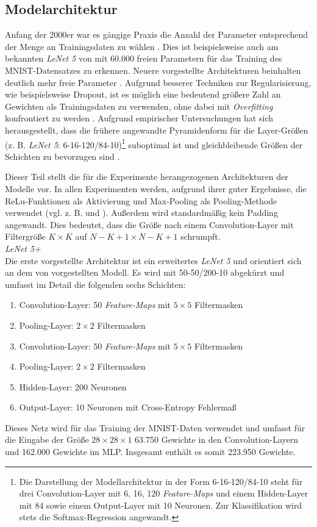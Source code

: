 \subsection{Modelarchitektur}
Anfang der 2000er war es gängige Praxis die Anzahl der Parameter entsprechend der Menge an Trainingsdaten zu wählen
\cite[vgl.][S. 95 f.]{Zander2001}. 
Dies ist beispielsweise auch am bekannten \textit{LeNet 5} von \cite{LeCun1998} mit 60.000 freien Parametern für das Training des MNIST-Datensatzes zu erkennen.
Neuere vorgestellte Architekturen beinhalten deutlich mehr freie Parameter \cite[vgl. z. B.][]{Andrade2014}. Aufgrund besserer Techniken zur Regularisierung, wie beispielsweise Dropout, ist es möglich eine bedeutend größere Zahl an Gewichten als Trainingsdaten zu verwenden, ohne dabei mit \textit{Overfitting} konfrontiert zu werden \cite[vgl.][]{Bengio2012}.
Aufgrund empirischer Untersuchungen hat sich herausgestellt, dass die frühere angewandte Pyramidenform für die Layer-Größen (z. B. \textit{LeNet 5}: 6-16-120/84-10)\footnote{Die Darstellung der Modellarchitektur in der Form 6-16-120/84-10 steht für drei Convolution-Layer mit 6, 16, 120 \textit{Feature-Maps} und einem Hidden-Layer mit 84 sowie einem Output-Layer mit 10 Neuronen. Zur Klassifikation wird stets die Softmax-Regression angewandt.} suboptimal ist und gleichbleibende Größen der Schichten zu bevorzugen sind \cite[vgl.][]{Larochell2009}. 

Dieser Teil stellt die für die Experimente herangezogenen Architekturen der Modelle vor. In allen Experimenten werden, aufgrund ihrer guter Ergebnisse, die ReLu-Funktionen als Aktivierung und Max-Pooling als Pooling-Methode verwendet (vgl. z. B. \cite{Krizhevsky2012} und \cite{Simonyan2014}). Außerdem wird standardmäßig kein Padding angewandt. Dies bedeutet, dass die Größe nach einem Convolution-Layer mit Filtergröße $K \times K$ auf $N - K + 1 \times N - K + 1$ schrumpft.\\

\textit{LeNet 5+}\\
Die erste vorgestellte Architektur ist ein erweitertes \textit{LeNet 5} und orientiert sich an dem von \cite{Ranzato2006} vorgestellten Modell. 
Es wird mit 50-50/200-10 abgekürzt und umfasst im Detail die folgenden sechs Schichten:
\begin{enumerate}
\setlength{\itemsep}{0pt}
\item Convolution-Layer: 50 \textit{Feature-Maps} mit $5 \times 5$ Filtermasken
\item Pooling-Layer:	$2 \times 2$ Filtermasken
\item Convolution-Layer: 50 \textit{Feature-Maps} mit $5 \times 5$ Filtermasken
\item Pooling-Layer:	$2 \times 2$ Filtermasken
\item Hidden-Layer: 200 Neuronen
\item Output-Layer: 10 Neuronen mit Cross-Entropy Fehlermaß
\end{enumerate}
Dieses Netz wird für das Training der MNIST-Daten verwendet und umfasst für die Eingabe der Größe $28 \times 28 \times 1$ 63.750 Gewichte in den Convolution-Layern und 162.000 Gewichte im MLP. Insgesamt enthält es somit 223.950 Gewichte. \\

